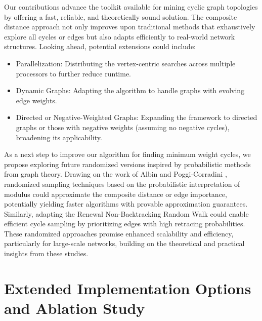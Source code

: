 \documentclass{article}
\begin{document}
Our contributions advance the toolkit available for mining cyclic graph topologies by offering a fast, reliable, and theoretically sound solution. The composite distance approach not only improves upon traditional methods that exhaustively explore all cycles or edges but also adapts efficiently to real-world network structures. Looking ahead, potential extensions could include:
\begin{itemize}
    \item Parallelization: Distributing the vertex-centric searches across multiple processors to further reduce runtime.
    \item Dynamic Graphs: Adapting the algorithm to handle graphs with evolving edge weights.
    \item Directed or Negative-Weighted Graphs: Expanding the framework to directed graphs or those with negative weights (assuming no negative cycles), broadening its applicability.
\end{itemize}
As a next step to improve our algorithm for finding minimum weight cycles, we propose exploring future randomized versions inspired by probabilistic methods from graph theory. Drawing on the work of Albin and Poggi-Corradini \cite{albin2016minimal}, randomized sampling techniques based on the probabilistic interpretation of modulus could approximate the composite distance or edge importance, potentially yielding faster algorithms with provable approximation guarantees. Similarly, adapting the Renewal Non-Backtracking Random Walk \cite{moradi2021new} could enable efficient cycle sampling by prioritizing edges with high retracing probabilities. These randomized approaches promise enhanced scalability and efficiency, particularly for large-scale networks, building on the theoretical and practical insights from these studies.


\appendix
\section{Extended Implementation Options and Ablation Study}
\label{app:ablation}
\end{document}
